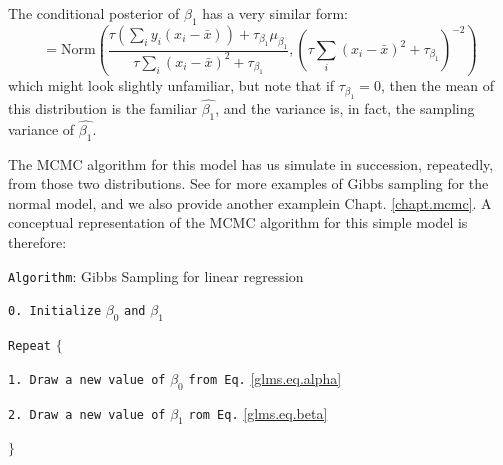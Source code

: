 The conditional posterior of $\beta_1$ has a very similar form:
\begin{equation}
 [\beta_1|y,\beta_0]  = \mbox{Norm}\left(
\frac{ \tau (\sum_{i} y_{i}(x_{i}-\bar{x}) ) + \tau_{\beta_1} \mu_{\beta_1}}
{ \tau \sum_{i} (x_{i}-\bar{x})^{2} + \tau_{\beta_1}},
(\tau \sum_{i} (x_{i}-\bar{x})^{2} + \tau_{\beta_1} )^{-2} \right)
\label{glms.eq.beta}
\end{equation}
which might look slightly unfamiliar, but note that if $\tau_{\beta_1} = 0$, 
then the mean of this distribution is the familiar $\hat{\beta_1}$, and
the variance is, in fact, the sampling variance of $\hat{\beta_1}$. 

The MCMC algorithm for this model has us simulate in succession,
repeatedly, from those two distributions. See \citet{gelman_etal:2004}
for more examples of Gibbs sampling for the normal model, and we also
provide another examplein Chapt. \ref{chapt.mcmc}. A
conceptual representation of the MCMC algorithm for this simple model
is therefore:

\vspace{.1in}

\parbox[h]{6in}{
{\tt Algorithm}: Gibbs Sampling for linear regression

\vspace{.1in}

\hspace{.25in}
     {\tt  0. Initialize} $\beta_0$ {\tt and} $\beta_1$

\vspace{.1in}


\hspace{.25in}
     {\tt  Repeat} $\{$

\vspace{.1in}
   
\hspace{.45in}
        {\tt 1. Draw a new value of} $\beta_0$ {\tt from Eq.} \ref{glms.eq.alpha}

\vspace{.1in}

\hspace{.45in}
        {\tt 2. Draw a new value of} $\beta_1$  {\tt rom Eq.} \ref{glms.eq.beta}

\vspace{.1in}

\hspace{.25in}
     $\}$
}

